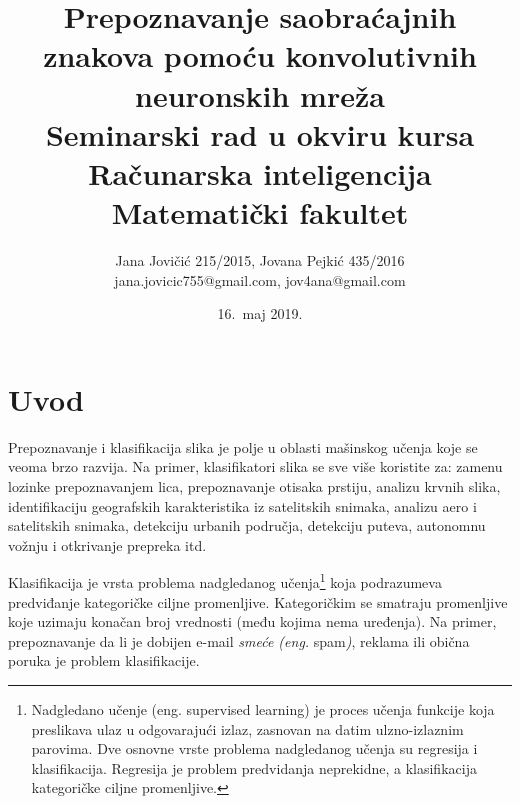 \documentclass[a4paper]{article}
\begin{document}
\title{Prepoznavanje saobraćajnih znakova pomoću konvolutivnih neuronskih mreža\\ \small{Seminarski rad u okviru kursa\\Računarska inteligencija\\ Matematički fakultet}}

\author{Jana Jovičić 215/2015, Jovana Pejkić 435/2016 \\ jana.jovicic755@gmail.com, jov4ana@gmail.com}

\date{16.~maj 2019.}

\maketitle

\abstract{

}

\newpage

\tableofcontents

\newpage

\section{Uvod}
\label{sec:uvod}

Prepoznavanje i klasifikacija slika je polje u oblasti mašinskog učenja koje se veoma brzo razvija. Na primer, klasifikatori slika se sve više koristite za: zamenu lozinke prepoznavanjem lica, prepoznavanje otisaka prstiju, analizu krvnih slika, identifikaciju geografskih karakteristika iz satelitskih snimaka, analizu aero i satelitskih snimaka, detekciju urbanih područja, detekciju puteva, autonomnu vožnju i otkrivanje prepreka itd.

Klasifikacija je vrsta problema nadgledanog učenja\footnote{Nadgledano učenje (eng. supervised learning) je proces učenja funkcije koja preslikava ulaz u odgovarajući izlaz, zasnovan na datim ulzno-izlaznim parovima. Dve osnovne vrste problema nadgledanog učenja su regresija i klasifikacija. Regresija je problem predvidanja neprekidne, a klasifikacija kategoričke ciljne promenljive.} koja podrazumeva predviđanje kategoričke ciljne promenljive. Kategoričkim se smatraju promenljive koje uzimaju konačan broj vrednosti (među kojima nema uređenja). Na primer, prepoznavanje da li je dobijen e-mail \textit{smeće (eng.} spam\textit{)}, reklama ili obična poruka je problem klasifikacije.
\end{document}
